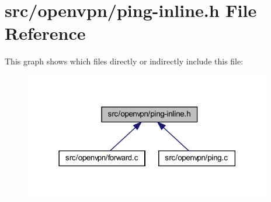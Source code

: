\hypertarget{ping-inline_8h}{}\section{src/openvpn/ping-\/inline.h File Reference}
\label{ping-inline_8h}
This graph shows which files directly or indirectly include this file\+:
\nopagebreak
\begin{figure}[H]
\begin{center}
\leavevmode
\includegraphics[width=306pt]{ping-inline_8h__dep__incl}
\end{center}
\end{figure}
